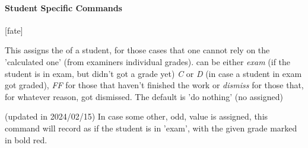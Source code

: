 \documentclass[article,nogeometry,english,tocdepth=3,secdepth=3]{ufrgscca} %
\begin{document}

\paragraph{Student Specific Commands}\label{student-specific-commands}
\begin{codedescribe}[code,update=2023/11/18,update=2024/02/15]{\studentfate}
	\begin{codesyntax}%
		\tsmacro{\studentfate}[fate]{}
	\end{codesyntax}
This assigns the  of a student, for those cases that one cannot rely on the 'calculated one' (from examiners individual grades).  can be either \emph{exam} (if the student is in exam, but didn't got a grade yet) \emph{C} or \emph{D} (in case a student in exam got graded), \emph{FF} for those that haven't finished the work or \emph{dismiss} for those that, for whatever reason, got dismissed. The default is 'do nothing' (no  assigned)
\end{codedescribe}
\begin{tsremark}
(updated in 2024/02/15) In case some other, odd, value is assigned, this command will record as if the student is in 'exam', with the given grade  marked in bold red.
\end{tsremark}
\end{document}
